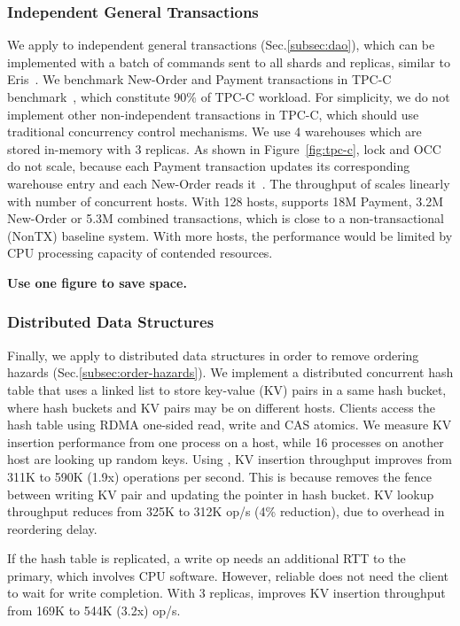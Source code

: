 \subsubsection{Independent General Transactions}
\label{subsec:eval-transactions}

We apply \sys to independent general transactions (Sec.\ref{subsec:dao}), which can be implemented with a batch of commands sent to all shards and replicas, similar to Eris~\cite{eris}.
We benchmark New-Order and Payment transactions in TPC-C benchmark~\cite{tpcc}, which constitute 90\% of TPC-C workload.
For simplicity, we do not implement other non-independent transactions in TPC-C, which should use traditional concurrency control mechanisms.
We use 4 warehouses which are stored in-memory with 3 replicas.
As shown in Figure~\ref{fig:tpc-c}, lock and OCC do not scale, because each Payment transaction updates its corresponding warehouse entry and each New-Order reads it~\cite{yu2014staring}.
The throughput of \sys scales linearly with number of concurrent hosts. With 128 hosts, \sys supports 18M Payment, 3.2M New-Order or 5.3M combined transactions, which is close to a non-transactional (NonTX) baseline system. With more hosts, the performance would be limited by CPU processing capacity of contended resources.

\textbf{Use one figure to save space.}

\subsubsection{Distributed Data Structures}
\label{subsec:eval-transactions}

Finally, we apply \sys{} to distributed data structures in order to remove ordering hazards (Sec.\ref{subsec:order-hazards}).
We implement a distributed concurrent hash table that uses a linked list to store key-value (KV) pairs in a same hash bucket, where hash buckets and KV pairs may be on different hosts.
Clients access the hash table using RDMA one-sided read, write and CAS atomics.
We measure KV insertion performance from one process on a host, while 16 processes on another host are looking up random keys.
Using \sys{}, KV insertion throughput improves from 311K to 590K (1.9x) operations per second.
This is because \sys{} removes the fence between writing KV pair and updating the pointer in hash bucket.
KV lookup throughput reduces from 325K to 312K op/s (4\% reduction), due to overhead in reordering delay.

If the hash table is replicated, a write op needs an additional RTT to the primary, which involves CPU software. However, reliable \sys{} does not need the client to wait for write completion.
With 3 replicas, \sys{} improves KV insertion throughput from 169K to 544K (3.2x) op/s.

